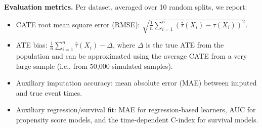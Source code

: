 \documentclass{article} %
\begin{document}
\textbf{Evaluation metrics.}
Per dataset, averaged over 10 random splits, we report:
\begin{itemize}[leftmargin=*,itemsep=0pt,parsep=0pt,partopsep=0pt,topsep=-4pt]
    \item CATE root mean square error (RMSE): $\sqrt{\frac1n\sum_{i=1}^n (\hat\tau(X_i)-\tau(X_i))^2}$.
    \item ATE bias: $\frac1n\sum_{i=1}^n\hat\tau(X_i)-\Delta$, where $\Delta$ is the true ATE from the population and can be approximated using the average CATE from a very large sample (i.e., from 50,000 simulated samples).
    \item Auxiliary imputation accuracy: mean absolute error (MAE) between imputed and true event times.
    \item Auxiliary regression/survival fit: MAE for regression-based learners, AUC for propensity score models, and the time-dependent C-index \citep{antolini2005time} for survival models.
\end{itemize}
\end{document}
